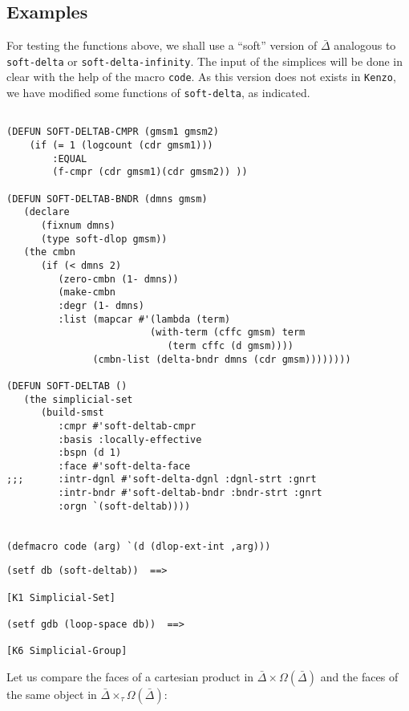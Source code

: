 \subsection* {Examples}

For testing the functions above, we shall use a ``soft'' version of $\bar{\Delta}$ analogous
to {\tt soft-delta} or {\tt soft-delta-infinity}. The input of the simplices will be done
in clear with the help of the macro {\tt code}. As this version does not exists in {\tt Kenzo},
we have modified some functions of {\tt soft-delta}, as indicated.
{\footnotesize\begin{verbatim}

(DEFUN SOFT-DELTAB-CMPR (gmsm1 gmsm2)
    (if (= 1 (logcount (cdr gmsm1))) 
        :EQUAL
        (f-cmpr (cdr gmsm1)(cdr gmsm2)) ))

(DEFUN SOFT-DELTAB-BNDR (dmns gmsm)
   (declare
      (fixnum dmns)
      (type soft-dlop gmsm))
   (the cmbn
      (if (< dmns 2)
         (zero-cmbn (1- dmns))
         (make-cmbn
         :degr (1- dmns)
         :list (mapcar #'(lambda (term)
                         (with-term (cffc gmsm) term
                            (term cffc (d gmsm))))
               (cmbn-list (delta-bndr dmns (cdr gmsm))))))))

(DEFUN SOFT-DELTAB ()
   (the simplicial-set
      (build-smst
         :cmpr #'soft-deltab-cmpr
         :basis :locally-effective
         :bspn (d 1)
         :face #'soft-delta-face
;;;      :intr-dgnl #'soft-delta-dgnl :dgnl-strt :gnrt
         :intr-bndr #'soft-deltab-bndr :bndr-strt :gnrt
         :orgn `(soft-deltab))))


(defmacro code (arg) `(d (dlop-ext-int ,arg)))
\end{verbatim}}
\newpage
{\footnotesize\begin{verbatim}
(setf db (soft-deltab))  ==>

[K1 Simplicial-Set]

(setf gdb (loop-space db))  ==>

[K6 Simplicial-Group]
\end{verbatim}}
Let us compare the faces of a cartesian product in $\bar{\Delta} \times \Omega(\bar{\Delta})$
and the faces of the same object in $\bar{\Delta} \times_\tau \Omega(\bar{\Delta})$:
